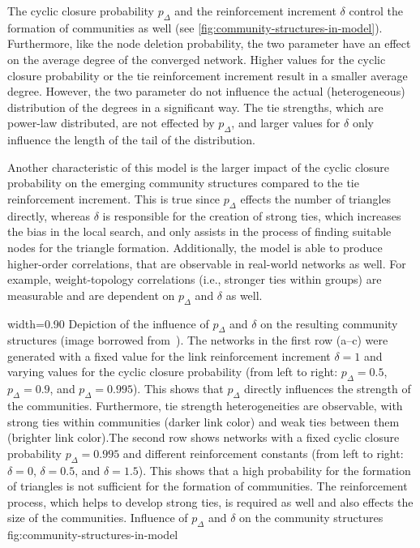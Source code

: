 The cyclic closure probability \( p_{\Delta} \) and the reinforcement increment \( \delta \) control the formation of communities as well (see \cref{fig:community-structures-in-model}).
Furthermore, like the node deletion probability, the two parameter have an effect on the average degree of the converged network.
Higher values for the cyclic closure probability or the tie reinforcement increment result in a smaller average degree.
However, the two parameter do not influence the actual (heterogeneous) distribution of the degrees in a significant way.
The tie strengths, which are power-law distributed, are not effected by \( p_{\Delta} \), and larger values for \( \delta \) only influence the length of the tail of the distribution.

Another characteristic of this model is the larger impact of the cyclic closure probability on the emerging community structures compared to the tie reinforcement increment.
This is true since \( p_{\Delta} \) effects the number of triangles directly, whereas \( \delta \) is responsible for the creation of strong ties, which increases the bias in the local search, and only assists in the process of finding suitable nodes for the triangle formation.
Additionally, the model is able to produce higher-order correlations, that are observable in real-world networks as well.
For example, weight-topology correlations (i.e., stronger ties within groups) are measurable and are dependent on \( p_{\Delta} \) and \( \delta \) as well.


      {width=0.90\textwidth}
      {Depiction of the influence of \( p_{\Delta} \) and \( \delta \) on the resulting community structures (image borrowed from~\cite{Laurent2015}). The networks in the first row (a--c) were generated with a fixed value for the link reinforcement increment \(\delta = 1\) and varying values for the cyclic closure probability (from left to right: \( p_{\Delta} = 0.5 \), \( p_{\Delta} = 0.9 \), and \( p_{\Delta} = 0.995 \)). This shows that \( p_{\Delta} \) directly influences the strength of the communities. Furthermore, tie strength heterogeneities are observable, with strong ties within communities (darker link color) and weak ties between them (brighter link color).The second row shows networks with a fixed cyclic closure probability \( p_{\Delta} = 0.995 \) and different reinforcement constants (from left to right: \(\delta = 0\), \(\delta = 0.5\), and \(\delta = 1.5\)). This shows that a high probability for the formation of triangles is not sufficient for the formation of communities. The reinforcement process, which helps to develop strong ties, is required as well and also effects the size of the communities.}
      {Influence of \( p_{\Delta} \) and \( \delta \) on the community structures}
      {fig:community-structures-in-model}



